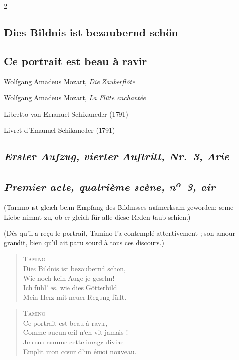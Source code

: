 \documentclass[a4paper,12pt]{article}
\newcommand\chunks[2]{%
\begin{leftcolumn*}\begin{otherlanguage}{german}%
{#1}%
\end{otherlanguage}\end{leftcolumn*}%
\begin{rightcolumn}\begin{otherlanguage}{french}%
{#2}%
\end{otherlanguage}\end{rightcolumn}%
}
\newcommand\strophe[1]{\subsection*{\normalsize\normalfont\itshape #1}}
\begin{document}
\thispagestyle{empty}
\setlength{\columnsep}{8mm}


\begin{paracol}{2}
  \chunks{\section*{Dies Bildnis ist bezaubernd schön}}
         {\section*{Ce portrait est beau à ravir}}

  \chunks{\noindent\raggedright\small Wolfgang Amadeus Mozart, \textit{Die Zauberflöte}}
         {\noindent\raggedright\small Wolfgang Amadeus Mozart, \textit{La Flûte enchantée}}

  \chunks{\noindent\raggedright\small Libretto von Emanuel Schikaneder (1791)}
         {\noindent\raggedright\small Livret d’Emanuel Schikaneder (1791)}

  \chunks{\strophe{Erster Aufzug, vierter Auftritt, Nr.~3, Arie}}
         {\strophe{Premier acte, quatrième scène, n\textsuperscript{o}~3, air}}

  \chunks{\noindent\small(Tamino ist gleich beim Empfang des Bildnisses aufmerksam geworden; seine Liebe nimmt zu, ob er gleich für alle diese Reden taub schien.)}
         {\noindent\small(Dès qu’il a reçu le portrait, Tamino l’a contemplé attentivement ; son amour grandit, bien qu’il ait paru sourd à tous ces discours.)}

  \chunks{\begin{verse}
          \textsc{Tamino}\\[\medskipamount]
          Dies Bildnis ist bezaubernd schön,\\
          Wie noch kein Auge je gesehn!\\
          Ich fühl’ es, wie dies Götterbild\\
          Mein Herz mit neuer Regung füllt.
          \end{verse}}
         {\begin{verse}
          \textsc{Tamino}\\[\medskipamount]
          Ce portrait est beau à ravir,\\
          Comme aucun œil n’en vit jamais !\\
          Je sens comme cette image divine\\
          Emplit mon cœur d’un émoi nouveau.
          \end{verse}}


\end{paracol}
\end{document}
